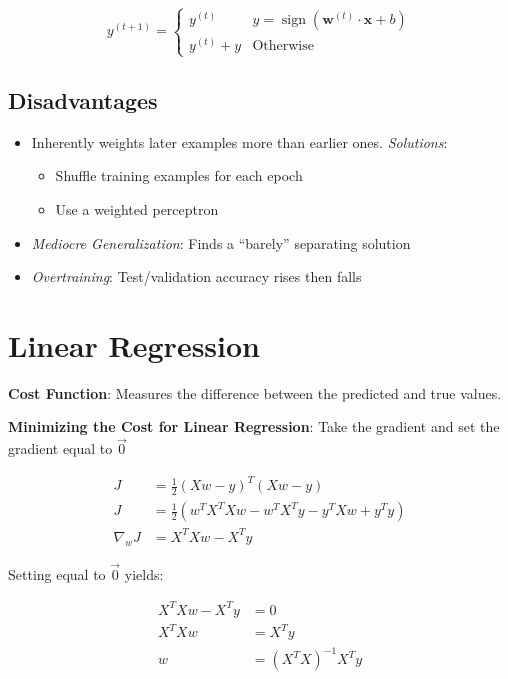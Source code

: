 \documentclass[10pt]{article}
\DeclareMathOperator*{\sign}{sign}
\begin{document}
\begin{multicols}{3}
  \[ y^{(t+1)} = \begin{cases}
                   y^{(t)}      & y = \sign(\mathbf{w}^{(t)}\cdot\mathbf{x} +b) \\
                   y^{(t)} + y  & \text{Otherwise}
                 \end{cases} \]

  \subsection*{Disadvantages}

  \begin{itemize}
    \item Inherently weights later examples more than earlier ones.  \textit{Solutions}:
      \begin{itemize}
        \item Shuffle training examples for each epoch
        \item Use a weighted perceptron
      \end{itemize}
    \item \textit{Mediocre Generalization}: Finds a ``barely'' separating solution
    \item \textit{Overtraining}: Test/validation accuracy rises then falls
  \end{itemize}
  \section{Linear Regression}

  \textbf{Cost Function}: Measures the difference between the predicted and true values.

  \textbf{Minimizing the Cost for Linear Regression}: Take the gradient and set the gradient equal to $\vec{0}$

  \begin{align*}
    J &= \frac{1}{2}(Xw-y)^{T}(Xw-y) \\
    J &= \frac{1}{2}(w^{T}X^{T}Xw - w^{T}X^{T}y -y^{T}Xw + y^{T}y) \\
    \nabla_{w}J &= X^{T}Xw-X^{T}y
  \end{align*}

  Setting equal to $\vec{0}$ yields:

  \begin{align*}
    X^{T}Xw - X^{T}y &= 0 \\
    X^{T}Xw &= X^{T}y \\
    w &= (X^{T}X)^{-1}X^{T}y \\
  \end{align*}


\end{multicols}
\end{document}
